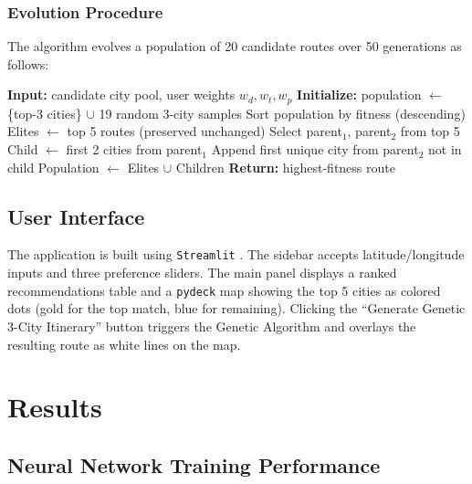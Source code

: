 \documentclass[12pt]{article}
\begin{document}
\subsubsection{Evolution Procedure}
The algorithm evolves a population of 20 candidate routes over 50 generations as follows:

\begin{algorithm}[H]
\caption{Genetic Algorithm Itinerary Planner}
\begin{algorithmic}[1]
\State \textbf{Input:} candidate city pool, user weights $w_d, w_t, w_p$
\State \textbf{Initialize:} population $\leftarrow$ \{top-3 cities\} $\cup$ 19 random 3-city samples
    \State Sort population by fitness (descending)
    \State Elites $\leftarrow$ top 5 routes (preserved unchanged)
        \State Select parent$_1$, parent$_2$ from top 5
        \State Child $\leftarrow$ first 2 cities from parent$_1$
        \State Append first unique city from parent$_2$ not in child
    \EndWhile
    \State Population $\leftarrow$ Elites $\cup$ Children
\EndFor
\State \textbf{Return:} highest-fitness route
\end{algorithmic}
\end{algorithm}

\subsection{User Interface}
The application is built using \texttt{Streamlit} \citep{streamlit2024}. The sidebar accepts latitude/longitude inputs and three preference sliders. The main panel displays a ranked recommendations table and a \texttt{pydeck} map \citep{deckgl2024} showing the top 5 cities as colored dots (gold for the top match, blue for remaining). Clicking the ``Generate Genetic 3-City Itinerary'' button triggers the Genetic Algorithm and overlays the resulting route as white lines on the map.

\section{Results}

\subsection{Neural Network Training Performance}
\end{document}
